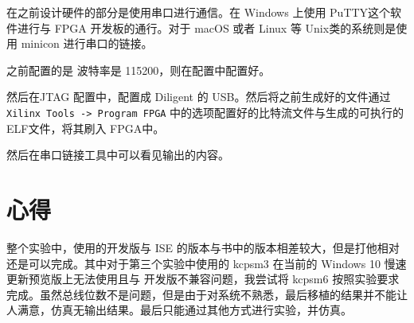 \documentclass{ctexart}
\begin{document}
        在之前设计硬件的部分是使用串口进行通信。在 Windows 上使用
        PuTTY这个软件进行与 FPGA 开发板的通行。对于 macOS 或者 Linux
        等 Unix类的系统则是使用 minicon 进行串口的链接。
        
        之前配置的是 波特率是 115200，则在配置中配置好。
        
        然后在JTAG 配置中，配置成 Diligent 的 USB。然后将之前生成好的文件通过
        \verb|Xilinx Tools -> Program FPGA|  中的选项配置好的比特流文件与生成的可执行的ELF文件，将其刷入 FPGA中。

        然后在串口链接工具中可以看见输出的内容。

        \section{心得}
        整个实验中，使用的开发版与 ISE 的版本与书中的版本相差较大，但是打他相对还是可以完成。其中对于第三个实验中使用的 kcpsm3 在当前的 Windows 10 慢速更新预览版上无法使用且与 开发版不兼容问题，我尝试将 kcpsm6 按照实验要求完成。虽然总线位数不是问题，但是由于对系统不熟悉，最后移植的结果并不能让人满意，仿真无输出结果。最后只能通过其他方式进行实验，并仿真。

        
\end{document}
